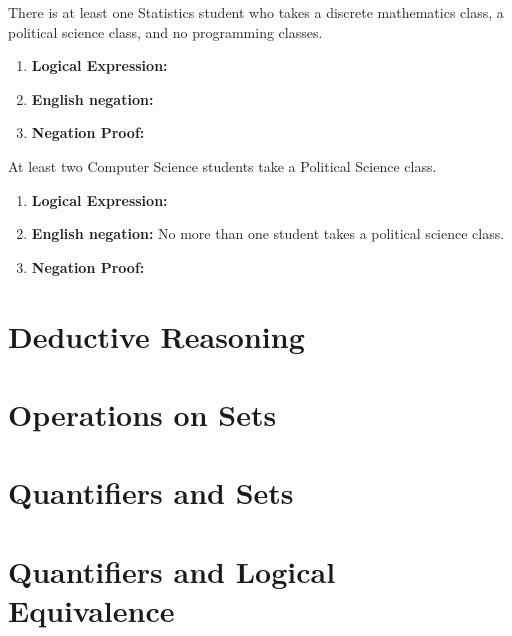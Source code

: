 \documentclass[]{article}
\begin{document}
\begin{question}{2.4}
There is at least one Statistics student who takes a discrete mathematics class, a political science class, and no
programming classes.
\end{question}
\begin{enumerate}[label=(\alph*)]
    \item \textbf{Logical Expression:} 
    \item \textbf{English negation:} 
    \item \textbf{Negation Proof:}
\end{enumerate}

\begin{question}{2.5}
At least two Computer Science students take a Political Science class.
\end{question}
\begin{enumerate}[label=(\alph*)]
    \item \textbf{Logical Expression:}
    \item \textbf{English negation:} No more than one student takes a political science class.
    \item \textbf{Negation Proof:}
\end{enumerate}

\section{Deductive Reasoning}
\section{Operations on Sets}
\section{Quantifiers and Sets}
\section{Quantifiers and Logical Equivalence}
\end{document}
